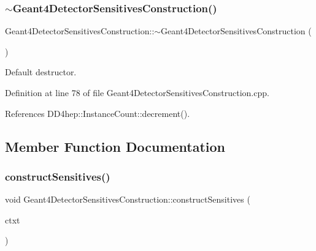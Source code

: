 \subsubsection{\texorpdfstring{$\sim$\+Geant4\+Detector\+Sensitives\+Construction()}{~Geant4DetectorSensitivesConstruction()}}
{\footnotesize\ttfamily Geant4\+Detector\+Sensitives\+Construction\+::$\sim$\+Geant4\+Detector\+Sensitives\+Construction (\begin{DoxyParamCaption}{ }\end{DoxyParamCaption})\hspace{0.3cm}{\ttfamily [virtual]}}



Default destructor. 



Definition at line 78 of file Geant4\+Detector\+Sensitives\+Construction.\+cpp.



References D\+D4hep\+::\+Instance\+Count\+::decrement().



\subsection{Member Function Documentation}
\hypertarget{class_d_d4hep_1_1_simulation_1_1_geant4_detector_sensitives_construction_ae698013abe689d2e76e1423d5e08f246}{}\label{class_d_d4hep_1_1_simulation_1_1_geant4_detector_sensitives_construction_ae698013abe689d2e76e1423d5e08f246} 
\subsubsection{\texorpdfstring{construct\+Sensitives()}{constructSensitives()}}
{\footnotesize\ttfamily void Geant4\+Detector\+Sensitives\+Construction\+::construct\+Sensitives (\begin{DoxyParamCaption}\item[{\hyperlink{class_d_d4hep_1_1_simulation_1_1_geant4_detector_construction_context}{Geant4\+Detector\+Construction\+Context} $\ast$}]{ctxt }\end{DoxyParamCaption})\hspace{0.3cm}{\ttfamily [virtual]}}



